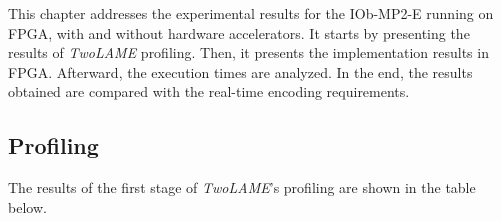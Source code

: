 


This chapter addresses the experimental results for the IOb-MP2-E running on FPGA, with and without hardware accelerators.
It starts by presenting the results of \textit{TwoLAME} profiling. Then, it presents the implementation results in FPGA. Afterward, the execution times are analyzed. In the end, the results obtained are compared with the real-time encoding requirements.

\subsection{Profiling}

The results of the first stage of \textit{TwoLAME}'s profiling are shown in the table below.

